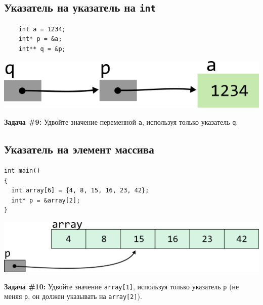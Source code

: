 \documentclass{article}
\begin{document}
\subsection*{Указатель на указатель на \texttt{int}}

\begin{multicols}{2}
\begin{lstlisting}
	int a = 1234;
	int* p = &a;
	int** q = &p;
\end{lstlisting}
\columnbreak
\begin{center}
\includegraphics[scale=1]{../images/pointer_schemes/pointer_to_pointer_to_int.png}
\end{center}
\end{multicols}
\textbf{Задача \#9:} Удвойте значение переменной \texttt{a}, используя только указатель \texttt{q}.

\newpage
\subsection*{Указатель на элемент массива}
\begin{multicols}{2}
\begin{lstlisting}
int main()
{
  int array[6] = {4, 8, 15, 16, 23, 42};
  int* p = &array[2];
}
\end{lstlisting}
\columnbreak
\begin{center}
\includegraphics[scale=0.75]{../images/pointer_schemes/pointer_to_array_of_ints.png}
\end{center}
\end{multicols}

\textbf{Задача \#10:} Удвойте значение \texttt{array[1]}, используя только указатель \texttt{p} (не меняя \texttt{p}, он должен указывать на \texttt{array[2]}).
\end{document}
